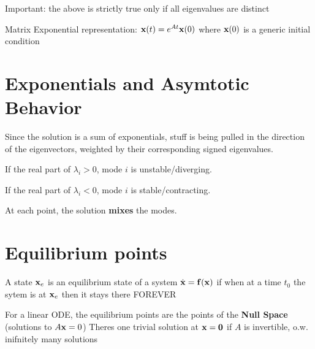 Important: the above is strictly true only if all eigenvalues are distinct

Matrix Exponential representation: $\mathbf{x}(t) = e^{A t} \mathbf{x}(0)$ where $\mathbf{x}(0)$ is a generic initial condition

\section*{Exponentials and Asymtotic Behavior}

Since the solution is a sum of exponentials, stuff is being pulled in the direction of the eigenvectors,
weighted by their corresponding signed eigenvalues.


If the real part of $\lambda_i > 0$, mode $i$ is unstable/diverging.

If the real part of $\lambda_i < 0$, mode $i$ is stable/contracting.

At each point, the solution \textbf{mixes} the modes.

\section*{Equilibrium points}

A state $\mathbf{x}_e$ is an equilibrium state of a system $\dot{\mathbf{x}} = \mathbf{f}(\mathbf{x})$ if
when at a time $t_0$ the sytem is at $\mathbf{x}_e$ then it stays there FOREVER

For a linear ODE, the equilibrium points are the points of the \textbf{Null Space} (solutions to $A \mathbf{x} = 0$)
Theres one trivial solution at $\mathbf{x} = \mathbf{0}$ if $A$ is invertible, o.w. inifnitely many solutions


